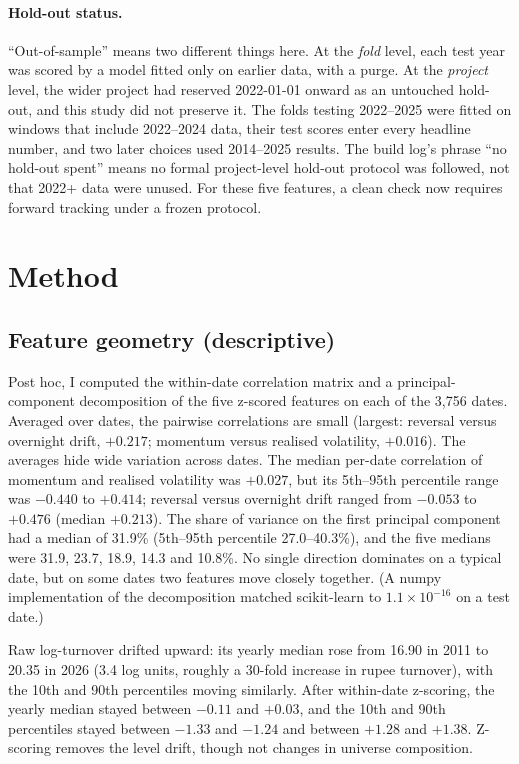 \documentclass[11pt]{article}
\begin{document}
\paragraph{Hold-out status.}\label{sec:holdout}
``Out-of-sample'' means two different things here. At the \emph{fold} level, each test year was scored by a model fitted only on earlier data, with a purge. At the \emph{project} level, the wider project had reserved 2022-01-01 onward as an untouched hold-out, and this study did not preserve it. The folds testing 2022--2025 were fitted on windows that include 2022--2024 data, their test scores enter every headline number, and two later choices used 2014--2025 results. The build log's phrase ``no hold-out spent'' means no formal project-level hold-out protocol was followed, not that 2022+ data were unused. For these five features, a clean check now requires forward tracking under a frozen protocol.

\section{Method}
\label{sec:method}

\subsection{Feature geometry (descriptive)}
Post hoc, I computed the within-date correlation matrix and a principal-component decomposition of the five z-scored features on each of the 3,756 dates. Averaged over dates, the pairwise correlations are small (largest: reversal versus overnight drift, $+0.217$; momentum versus realised volatility, $+0.016$). The averages hide wide variation across dates. The median per-date correlation of momentum and realised volatility was $+0.027$, but its 5th--95th percentile range was $-0.440$ to $+0.414$; reversal versus overnight drift ranged from $-0.053$ to $+0.476$ (median $+0.213$). The share of variance on the first principal component had a median of 31.9\% (5th--95th percentile 27.0--40.3\%), and the five medians were 31.9, 23.7, 18.9, 14.3 and 10.8\%. No single direction dominates on a typical date, but on some dates two features move closely together. (A numpy implementation of the decomposition matched scikit-learn to $1.1\times10^{-16}$ on a test date.)

Raw log-turnover drifted upward: its yearly median rose from 16.90 in 2011 to 20.35 in 2026 (3.4 log units, roughly a 30-fold increase in rupee turnover), with the 10th and 90th percentiles moving similarly. After within-date z-scoring, the yearly median stayed between $-0.11$ and $+0.03$, and the 10th and 90th percentiles stayed between $-1.33$ and $-1.24$ and between $+1.28$ and $+1.38$. Z-scoring removes the level drift, though not changes in universe composition.
\end{document}
